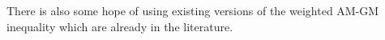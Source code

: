 \documentclass{article}
\newtheorem{lemma}[theorem]{Lemma}
\begin{document}
There is also some hope of using existing versions of the weighted AM-GM inequality which are already in the literature.







 

\end{document}
